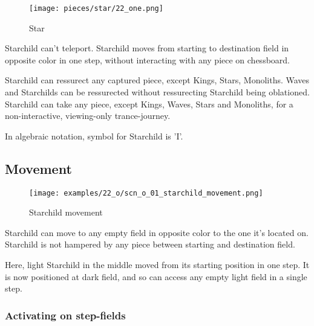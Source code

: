 \noindent
\begin{wrapfigure}[11]{l}{0.4\textwidth}
\centering
\texttt{[image: pieces/star/22\_one.png]}
\caption{Star}
\label{fig:star/22_one}
\end{wrapfigure}
Starchild can't teleport. Starchild moves from starting to destination field in opposite
color in one step, without interacting with any piece on chessboard.

Starchild can ressurect any captured piece, except Kings, Stars, Monoliths. Waves and
Starchilds can be ressurected without ressurecting Starchild being oblationed. Starchild
can take any piece, except Kings, Waves, Stars and Monoliths, for a non-interactive,
viewing-only trance-journey.

In algebraic notation, symbol for Starchild is 'I'.

\clearpage %

\subsection*{Movement}

\vspace*{-1.1\baselineskip}
\noindent
\begin{figure}[!h]
\texttt{[image: examples/22\_o/scn\_o\_01\_starchild\_movement.png]}
\caption{Starchild movement}
\label{fig:scn_o_01_starchild_movement}
\end{figure}

Starchild can move to any empty field in opposite color to the one it's located on.
Starchild is not hampered by any piece between starting and destination field.

Here, light Starchild in the middle moved from its starting position in one step.
It is now positioned at dark field, and so can access any empty light field in a
single step.

\clearpage %

\subsubsection*{Activating on step-fields}

